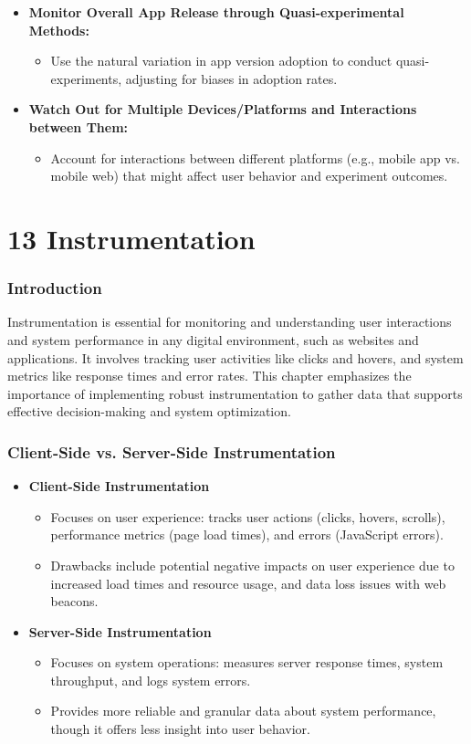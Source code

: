 \documentclass{article}
\begin{document}
\begin{itemize}
    \item \textbf{Monitor Overall App Release through Quasi-experimental Methods:}
    \begin{itemize}
        \item Use the natural variation in app version adoption to conduct quasi-experiments, adjusting for biases in adoption rates.
    \end{itemize}

    \item \textbf{Watch Out for Multiple Devices/Platforms and Interactions between Them:}
    \begin{itemize}
        \item Account for interactions between different platforms (e.g., mobile app vs. mobile web) that might affect user behavior and experiment outcomes.
    \end{itemize}
\end{itemize}

\section*{13 Instrumentation}
\subsubsection*{Introduction}
Instrumentation is essential for monitoring and understanding user interactions and system performance in any digital environment, such as websites and applications. It involves tracking user activities like clicks and hovers, and system metrics like response times and error rates. This chapter emphasizes the importance of implementing robust instrumentation to gather data that supports effective decision-making and system optimization.

\subsubsection*{Client-Side vs. Server-Side Instrumentation}
\begin{itemize}
    \item \textbf{Client-Side Instrumentation}
    \begin{itemize}
        \item Focuses on user experience: tracks user actions (clicks, hovers, scrolls), performance metrics (page load times), and errors (JavaScript errors).
        \item Drawbacks include potential negative impacts on user experience due to increased load times and resource usage, and data loss issues with web beacons.
    \end{itemize}
    \item \textbf{Server-Side Instrumentation}
    \begin{itemize}
        \item Focuses on system operations: measures server response times, system throughput, and logs system errors.
        \item Provides more reliable and granular data about system performance, though it offers less insight into user behavior.
    \end{itemize}
\end{itemize}
\end{document}
